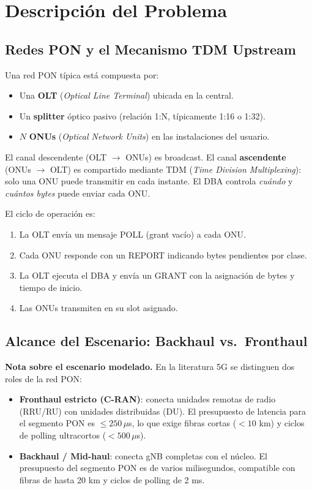 \documentclass[12pt, letterpaper]{article}
\begin{document}
\section{Descripción del Problema}

\subsection{Redes PON y el Mecanismo TDM Upstream}

Una red PON típica está compuesta por:
\begin{itemize}[leftmargin=1.5em]
  \item Una \textbf{OLT} (\textit{Optical Line Terminal}) ubicada en la central.
  \item Un \textbf{splitter} óptico pasivo (relación 1:N, típicamente 1:16 o 1:32).
  \item $N$ \textbf{ONUs} (\textit{Optical Network Units}) en las instalaciones del usuario.
\end{itemize}

El canal descendente (OLT $\to$ ONUs) es broadcast. El canal \textbf{ascendente} (ONUs $\to$ OLT) es compartido mediante TDM (\textit{Time Division Multiplexing}): solo una ONU puede transmitir en cada instante. El DBA controla \textit{cuándo} y \textit{cuántos bytes} puede enviar cada ONU.

El ciclo de operación es:
\begin{enumerate}[leftmargin=1.5em]
  \item La OLT envía un mensaje POLL (grant vacío) a cada ONU.
  \item Cada ONU responde con un REPORT indicando bytes pendientes por clase.
  \item La OLT ejecuta el DBA y envía un GRANT con la asignación de bytes y tiempo de inicio.
  \item Las ONUs transmiten en su slot asignado.
\end{enumerate}

\subsection{Alcance del Escenario: Backhaul vs.\ Fronthaul}

\noindent\textbf{Nota sobre el escenario modelado.} En la literatura 5G se distinguen dos roles de la red PON:

\begin{itemize}[leftmargin=1.5em]
  \item \textbf{Fronthaul estricto (C-RAN)}: conecta unidades remotas de radio (RRU/RU) con unidades distribuidas (DU). El presupuesto de latencia para el segmento PON es $\leq 250\,\mu$s, lo que exige fibras cortas ($< 10$ km) y ciclos de polling ultracortos ($< 500\,\mu$s).
  \item \textbf{Backhaul / Mid-haul}: conecta gNB completas con el núcleo. El presupuesto del segmento PON es de varios milisegundos, compatible con fibras de hasta 20 km y ciclos de polling de 2 ms.
\end{itemize}
\end{document}
